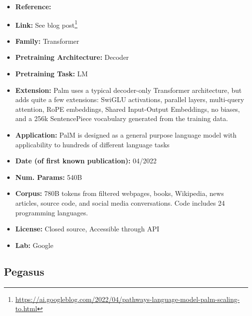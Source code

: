 \documentclass{article}
\begin{document}
            \begin{itemize}
                \item \textbf{Reference:} 
                \item \textbf{Link:} See blog post\footnote{\url{https://ai.googleblog.com/2022/04/pathways-language-model-palm-scaling-to.html}}
                \item \textbf{Family:} Transformer 
                \item \textbf{Pretraining Architecture:} Decoder
                \item \textbf{Pretraining Task:} LM
                \item \textbf{Extension:} Palm uses a typical decoder-only Transformer architecture, but adds quite a few extensions: SwiGLU activations, parallel layers, multi-query attention, RoPE embeddings, Shared Input-Output Embeddings, no biases, and a 256k SentencePiece vocabulary generated from the training data.  
                \item \textbf{Application:} PalM is designed as a general purpose language model with applicability to hundreds of different language tasks
                \item \textbf{Date (of first known publication):} 04/2022
                \item \textbf{Num. Params:} 540B
                \item \textbf{Corpus:} 780B tokens from filtered webpages, books, Wikipedia, news articles, source code, and social media conversations. Code includes 24 programming languages.
                \item \textbf{License:} Closed source, Accessible through API
                \item \textbf{Lab:} Google
            \end{itemize}

\subsection{Pegasus}
\end{document}
